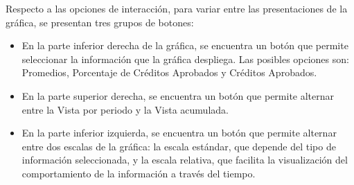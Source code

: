 Respecto a las opciones de interacción, para variar entre las presentaciones de la gráfica, se presentan tres grupos de botones:
\begin{itemize}
	\item En la parte inferior derecha de la gráfica, se encuentra un botón que permite seleccionar la información que la gráfica despliega. Las posibles opciones son: Promedios, Porcentaje de Créditos Aprobados y Créditos Aprobados.
	\item En la parte superior derecha, se encuentra un botón que permite alternar entre la Vista por periodo y la Vista acumulada.
	\item En la parte inferior izquierda, se encuentra un botón que permite alternar entre dos escalas de la gráfica: la escala estándar, que depende del tipo de información seleccionada, y la escala relativa, que facilita la visualización del comportamiento de la información a través del tiempo.
\end{itemize}

